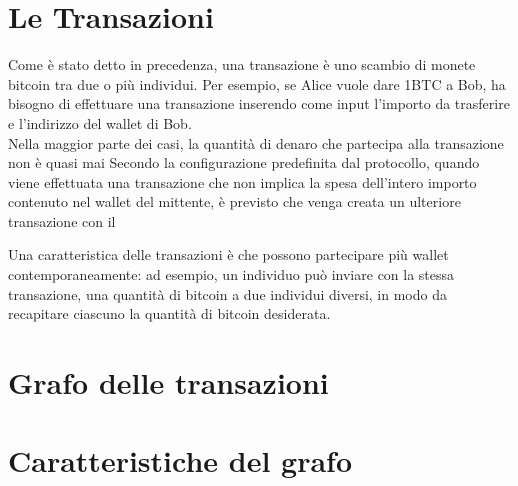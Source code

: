 \section{Le Transazioni}

Come è stato detto in precedenza, una transazione è uno scambio di monete bitcoin tra due o più individui. Per esempio, se Alice vuole dare 1BTC a Bob, ha bisogno di effettuare una transazione inserendo come input l'importo da trasferire e l'indirizzo del wallet di Bob. \\ 

Nella maggior parte dei casi, la quantità di denaro che partecipa alla transazione non è quasi mai
Secondo la configurazione predefinita dal protocollo, quando viene effettuata una transazione che non implica la spesa dell'intero importo contenuto nel wallet del mittente, è previsto che venga creata un ulteriore transazione con il 

Una caratteristica delle transazioni è che possono partecipare più wallet contemporaneamente: ad esempio, un individuo può inviare con la stessa transazione, una quantità di bitcoin a due individui diversi, in modo da recapitare ciascuno la quantità di bitcoin desiderata. 

\section{Grafo delle transazioni}
\section{Caratteristiche del grafo}